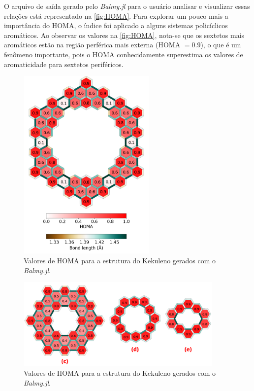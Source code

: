 O arquivo de saída gerado pelo \textit{Balmy.jl} para o usuário analisar e visualizar essas relações está representado na \autoref{fig:HOMA}. Para explorar um pouco mais a importância do \gls{HOMA}, o índice foi aplicado a alguns sistemas policíclicos aromáticos. Ao observar os valores na \autoref{fig:HOMA}, nota-se que os sextetos mais aromáticos estão na região perférica mais externa (\gls{HOMA} $= 0.9$), o que é um fenômeno importante, pois o \gls{HOMA} conhecidamente superestima os valores de aromaticidade para sextetos periféricos\autocite{giov2020}. 

\begin{figure}[htb]
\caption{\label{fig:HOMA} Valores de HOMA para a estrutura do Kekuleno gerados com o \textit{Balmy.jl}.}
	\begin{center}
		\includegraphics[width=0.60\textwidth]{images/geom.png}
	\end{center}
\end{figure}

\begin{figure}[htb]
\caption{\label{fig:HOMA2} Valores de HOMA para a estrutura do Kekuleno gerados com o \textit{Balmy.jl}.}
	\begin{center}
		\includegraphics[width=0.9\textwidth]{images/15.png}
	\end{center}
\end{figure}

